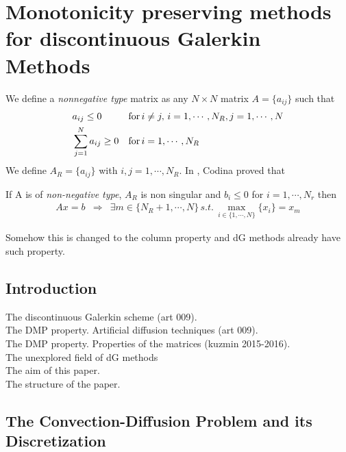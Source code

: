 \chapter{Monotonicity preserving methods for discontinuous Galerkin Methods}

We define a \textit{nonnegative type} matrix as any $N\times N$ matrix $A=\{a_{ij}\}$ such that
\begin{align}
&a_{ij} \leq 0  & & {\rm for}\, i\neq j, \, i=1,\cdots,N_R, j=1,\cdots,N \\
&\sum_{j=1}^{N} a_{ij} \geq 0 & &{\rm for}\, i=1,\cdots,N_R
\end{align}
We define $A_R = \{a_{ij}\}$ with $i,j=1,\cdots, N_R$.
In \cite{codina_discontinuity-capturing_1993}, Codina proved that
\begin{theorem}
	If A is of \textit{non-negative type}, $A_R$ is non singular and $b_i\leq 0$ for $i=1,\cdots,N_r$ then 
	\begin{align*}
	Ax=b & \Rightarrow & \exists m\in \{N_R+1,\cdots,N\} \, s.t. \, \max_{i\in\{1,\cdots,N\}}\{x_i\}=x_m
	\end{align*}
\end{theorem}

Somehow this is changed to the column property and dG methods already have such property.

\section{Introduction}

The discontinuous Galerkin scheme (art 009).\\

The DMP property. Artificial diffusion techniques (art 009).\\

The DMP property. Properties of the matrices (kuzmin 2015-2016).\\

The unexplored field of dG methods\\

The aim of this paper.\\

The structure of the paper.\\

\section{The Convection-Diffusion Problem and its Discretization}

